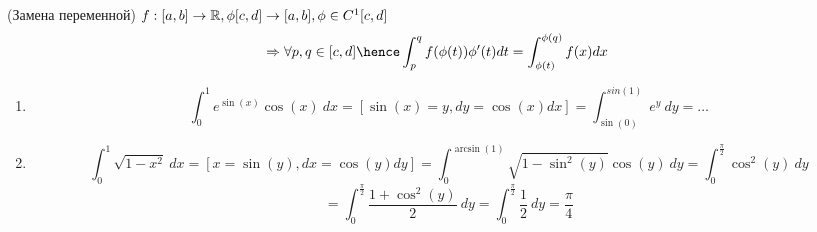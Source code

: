 \begin{properties}
    \item(Замена переменной) $ f:[a, b] \to \mathbb{R}, \phi [c, d] \to [a, b], \phi \in C^1[c, d]$ 
    \[\Rightarrow
    \forall p, q \in [c, d] \hence \int_p^q f(\phi(t)) \phi'(t) dt
    = \int_{\phi(t)}^{\phi(q)} f(x) dx\]

    \begin{example}
        \begin{enumerate}
            \item \[ \int_0^1 e^{\sin(x)} \cos(x) \ dx = [\sin(x) = y, dy = \cos(x) dx] 
            = \int_{\sin(0)}^{sin(1)} e^y \ dy = \ldots \]
            \item \[ \int_0^1 \sqrt{1 - x^2} \ dx = [x = \sin(y), dx 
            = \cos(y) dy] = \int_0^{\arcsin(1)} \sqrt{1 - \sin^2(y)} \cos(y) \ dy 
            = \int_0^{\frac \pi 2} \cos^2(y) \ dy \] 
            \[ = \int_0^{\frac \pi 2} \frac {1 + \cos^2(y)} 2 \ dy
            = \int_0^{\frac \pi 2} \frac 1 2 \ dy = \frac \pi 4\]
        \end{enumerate}
    \end{example}
\end{properties}
